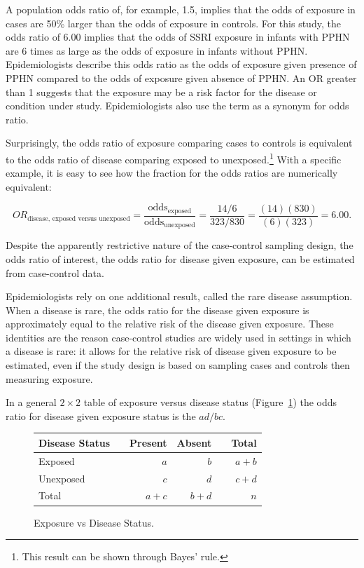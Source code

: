 \textD{\newpage}

A population odds ratio of, for example, 1.5, implies that the odds of exposure in cases are 50\% larger than the odds of exposure in controls. For this study, the odds ratio of 6.00 implies that the odds of SSRI exposure in infants with PPHN are 6 times as large as the odds of exposure in infants without PPHN. Epidemiologists describe this odds ratio as the odds of exposure given presence of PPHN compared to the odds of exposure given absence of PPHN. An OR greater than 1 suggests that the exposure may be a risk factor for the disease or condition under study.  Epidemiologists also use the term  as a synonym for odds ratio.

Surprisingly, the odds ratio of exposure comparing cases to controls is equivalent to the odds ratio of disease comparing exposed to unexposed.\footnote{This result can be shown through Bayes' rule.} With a specific example, it is easy to see how the fraction for the odds ratios are numerically equivalent:

\[OR_{\text{disease, exposed versus unexposed}} = \frac{\text{odds$_\text{exposed}$}}{\text{odds$_\text{unexposed}$}} = \frac{14/6}{323/830} = \frac{(14)(830)}{(6)(323)} = 6.00. \]

Despite the apparently restrictive nature of the case-control sampling design, the odds ratio of interest, the odds ratio for disease given exposure, can be estimated from case-control data.

Epidemiologists rely on one additional result, called the rare disease assumption. When a disease is rare, the odds ratio for the disease given exposure is approximately equal to the relative risk of the disease given exposure.  These identities are the reason case-control studies are widely used in settings in which a disease is rare: it allows for the relative risk of disease given exposure to be estimated, even if the study design is based on sampling cases and controls then measuring exposure.

In a general $2 \times 2$ table of exposure versus disease status (Figure~\ref{generalTwoByTwoTable}) the odds ratio for disease given exposure status is the $ad/bc$.
 \begin{figure}[h]
	\centering
	\begin{tabular}{ll rrr r}
		\hline
		Disease Status  & \hspace{2mm} & Present & Absent & \hspace{2mm} & Total \\
		\hline
		Exposed &	& $a$ & $b$ &  & $a + b$  \\
		Unexposed & & $c$ & $d$ &  & $c + d $  \\
        Total & & $a + c$ & $b + d$ & & $n$ \\
		\hline
	\end{tabular}
    \caption{Exposure vs Disease Status.}
    \label{generalTwoByTwoTable}
\end{figure}

